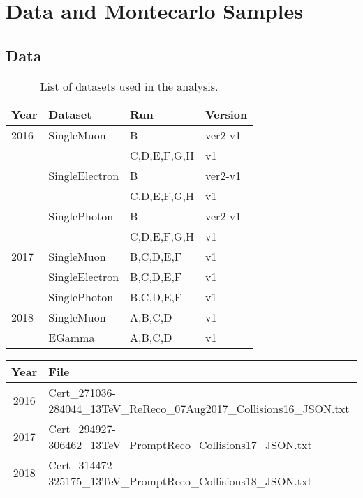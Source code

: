 \section{Data and Montecarlo Samples}

\subsection{Data}


\begin{table}[h]
\centering
\caption{List of datasets used in the analysis.}
\begin{tabular}{|l|l|l|l|}
\hline
Year & Dataset & Run & Version \\ \hline
2016 & SingleMuon     & B           & ver2-v1 \\
     &                & C,D,E,F,G,H & v1      \\
     & SingleElectron & B           & ver2-v1 \\
     &                & C,D,E,F,G,H & v1      \\
     & SinglePhoton   & B           & ver2-v1 \\
     &                & C,D,E,F,G,H & v1      \\ \hline
2017 & SingleMuon     & B,C,D,E,F & v1 \\
     & SingleElectron & B,C,D,E,F & v1 \\
     & SinglePhoton   & B,C,D,E,F & v1 \\\hline
2018 & SingleMuon & A,B,C,D & v1 \\
     & EGamma     & A,B,C,D & v1 \\ \hline
\end{tabular}
\label{tab:Datasets}
\end{table}

\begin{table}[htbp]
  \footnotesize
  \centering
  \label{tab:gJSON}
  \begin{tabular}{ c l }
    \hline
    Year & File \\
    \hline
    2016 & Cert\_271036-284044\_13TeV\_ReReco\_07Aug2017\_Collisions16\_JSON.txt \\
    2017 & Cert\_294927-306462\_13TeV\_PromptReco\_Collisions17\_JSON.txt \\
    2018 & Cert\_314472-325175\_13TeV\_PromptReco\_Collisions18\_JSON.txt \\
    \hline
  \end{tabular}
\end{table}


